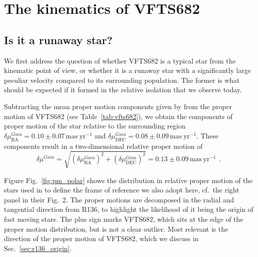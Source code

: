 \documentclass[a4paper,fleqn,usenatbib]{mnras}
\DeclareRobustCommand{\Figref}[1]{Fig.~\ref{#1}}
\DeclareRobustCommand{\Tabref}[1]{Table~\ref{#1}}
\DeclareRobustCommand{\Secref}[1]{Sec.~\ref{#1}}
\begin{document}
\section{The kinematics of VFTS682}
\label{sec:results}

\subsection{Is it a runaway star?}
\label{sec:runaway}
We first address the question of whether VFTS682 is a typical star
from the kinematic point of view, or whether it is a runaway star with
a significantly large peculiar velocity compared to its surrounding population. The former is what should
be expected if it formed in the relative isolation that we observe today.%

Subtracting the mean proper motion components given by
\citet{lennon:18} from the
proper motion of VFTS682 (see \Tabref{tab:vfts682}), we obtain the
components of proper motion of the star relative to the surrounding region
$\delta\mu_\mathrm{RA}^{Gaia} = 0.10 \pm 0.07\,\mathrm{mas\ yr^{-1}}$
and $\delta\mu_\mathrm{DEC}^{Gaia} = 0.08
\pm 0.09\,\mathrm{mas\ yr^{-1}}$. These components result in a
two-dimensional relative proper motion of
\begin{equation}
  \label{eq:pm_gaia_around}
  \delta \mu^{Gaia} = \sqrt{\left(\delta\mu_\mathrm{RA}^{Gaia}\right)^2+\left(\delta\mu_\mathrm{DEC}^{Gaia}\right)^2}
  = 0.13\pm 0.09\,\mathrm{mas\
  yr^{-1}} \ \ .
\end{equation}

Figure \Figref{fig:pm_polar} shows the distribution in relative proper motion
of the stars used in \cite{lennon:18} to define the frame of reference
we also adopt here, cf.~the right panel in their Fig.~2. The
proper motions are decomposed in the radial and tangential direction
from R136, to highlight the likelihood of it being the origin of fast
moving stars. The plus sign marks VFTS682, which sits at the edge of
the proper motion distribution, but is not a clear outlier. Most
relevant is the direction of the proper motion of VFTS682, which we
discuss in \Secref{sec:r136_origin}.
\end{document}
